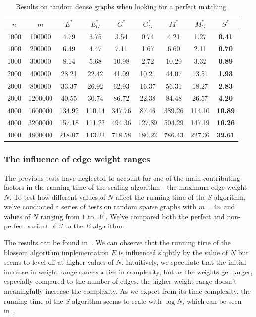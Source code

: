 \begin{table}
\centering
{} {
\begin{tabular}{
cc|ccccccc}
$n$ & $m$ & $E^*$ & $E^*_G$ & $G^*$ & $G^*_G$ & $M^*$ & $M^*_G$ & $S^*$ \\
\hline
1000 & 100000 & 4.79 & 3.75 & 3.54 & 0.74 & 4.21 & 1.27 & \textbf{0.41} \\
1000 & 200000 & 6.49 & 4.47 & 7.11 & 1.67 & 6.60 & 2.11 & \textbf{0.70} \\
1000 & 300000 & 8.14 & 5.68 & 10.98 & 2.72 & 10.29 & 3.32 & \textbf{0.89} \\
2000 & 400000 & 28.21 & 22.42 & 41.09 & 10.21 & 44.07 & 13.51 & \textbf{1.93} \\
2000 & 800000 & 33.37 & 26.92 & 62.93 & 16.37 & 56.31 & 18.27 & \textbf{2.83} \\
2000 & 1200000 & 40.55 & 30.74 & 86.72 & 22.38 & 84.48 & 26.57 & \textbf{4.20} \\
4000 & 1600000 & 134.92 & 110.14 & 347.76 & 87.46 & 389.26 & 114.10 & \textbf{10.89} \\
4000 & 3200000 & 157.18 & 111.22 & 494.36 & 127.89 & 504.29 & 147.19 & \textbf{16.26} \\
4000 & 4800000 & 218.07 & 143.22 & 718.58 & 180.23 & 786.43 & 227.36 & \textbf{32.61} \\
\end{tabular}
}
\caption{Results on random dense graphs when looking for a perfect matching}\label{tab:perfect_dense}
\end{table}

\subsubsection*{The influence of edge weight ranges}

The previous tests have neglected to account for one of the main contributing factors in the running time of the scaling algorithm - the maximum edge weight $N$. To test how different values of $N$ affect the running time of the $S$ algorithm, we've conducted a series of tests on random sparse graphs with $m = 4n$ and values of $N$ ranging from $1$ to $10^7$. We've compared both the perfect and non-perfect variant of $S$ to the $E$ algorithm. 

The results can be found in~. We can observe that the running time of the blossom algorithm implementation $E$ is influenced slightly by the value of $N$ but seems to level off at higher values of $N$. Intuitively, we speculate that the initial increase in weight range causes a rise in complexity, but as the weights get larger, especially compared to the number of edges, the higher weight range doesn't meaningfully increase the complexity. As we expect from its time complexity, the running time of the $S$ algorithm seems to scale with $\log N$, which can be seen in~.

